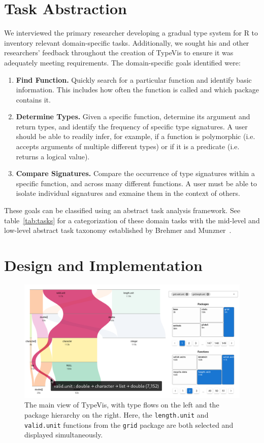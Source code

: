 \documentclass[review]{vgtc}                 %
\newcommand{\typevis}{{\sc TypeVis}\xspace}
\begin{document}
\section{Task Abstraction}

We interviewed the primary researcher developing a gradual type system for R
to inventory relevant domain-specific tasks.
Additionally, we sought his and other researchers' feedback
throughout the creation of \typevis
to ensure it was adequately meeting requirements.
The domain-specific goals identified were:

\begin{enumerate}
\item {\bf Find Function.} Quickly search for a particular function and identify basic information. This includes how often the function is called and which package contains it.
\item {\bf Determine Types.} Given a specific function,
  determine its argument and return types, and identify the frequency of specific type signatures.
  A user should be able to readily infer, for example,
  if a function is polymorphic (i.e. accepts arguments of multiple different types) or if it is a predicate (i.e. returns a logical value).
\item {\bf Compare Signatures.} Compare the occurrence of type signatures within a specific function, and across many different functions. A user must be able to isolate individual signatures and exmaine them in the context of others.
\end{enumerate}

These goals can be classified using an abstract task analysis framework.
See table~\ref{tab:tasks} for a categorization of these domain tasks
with the mid-level and low-level abstract task taxonomy
established by Brehmer and Munzner~\cite{brehmer:2013}.


\section{Design and Implementation}

\begin{figure}
 \centering
 \includegraphics[width=\linewidth]{img/typevis.png}
 \caption{The main view of \typevis, with type flows on the left and the package hierarchy on the right. Here, the {\tt length.unit} and {\tt valid.unit} functions from the {\tt grid} package are both selected and displayed simultaneously.}
 \label{fig:typevis}
\end{figure}
\end{document}
